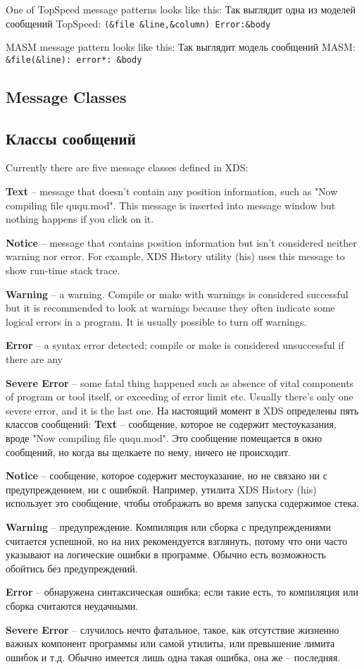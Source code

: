 \ifenglish
One of TopSpeed message patterns looks like this:
\else
Так выглядит одна из моделей сообщений TopSpeed:
\fi
\verb'(&file &line,&column) Error:&body'

\ifenglish
MASM message pattern looks like this:
\else
Так выглядит модель сообщений MASM:
\fi
\verb'&file(&line): error*: &body'

\ifenglish
\subsection{Message Classes}
\else
\subsection{Классы сообщений}
\fi
{}

\ifenglish
Currently there are five message classes defined in XDS:

{\bf Text} -- message that doesn't contain any position information, such as
"Now compiling file ququ.mod". This message is inserted into message window
but nothing happens if you click on it.

{\bf Notice} -- message that contains position information but isn't considered
neither warning nor error. For example, XDS History utility (his) uses this
message to show run-time stack trace.

{\bf Warning} -- a warning. Compile or make with warnings is considered successful
but it is recommended to look at warnings because they often indicate some
logical errors in a program. It is usually possible to turn off warnings.

{\bf Error} -- a syntax error detected; compile or make is considered unsuccessful
if there are any

{\bf Severe Error} -- some fatal thing happened such as absence of vital components
of program or tool itself, or exceeding of error limit etc. Usually there's only
one severe error, and it is the last one.
\else
На настоящий момент в XDS определены пять классов сообщений:
{\bf Text} -- сообщение, которое не содержит местоуказания, вроде
"Now compiling file ququ.mod". Это сообщение помещается в окно сообщений,
но когда вы щелкаете по нему, ничего не происходит. 

{\bf Notice} -- сообщение, которое содержит местоуказание, но не связано ни с  
предупреждением, ни с ошибкой. Например, утилита XDS History (his) использует
это сообщение, чтобы отображать во время запуска содержимое стека.

{\bf Warning} -- предупреждение. Компиляция или сборка с предупреждениями считается
успешной, но на них рекомендуется взглянуть, потому что они часто указывают
на логические ошибки в программе. Обычно есть возможность обойтись без предупреждений.

{\bf Error} -- обнаружена синтаксическая ошибка; если такие есть, то компиляция или 
сборка считаются неудачными.

{\bf Severe Error} -- случилось нечто фатальное, такое, как отсутствие жизненно
важных компонент программы или самой утилиты, или превышение лимита ошибок и т.д.
Обычно имеется лишь одна такая ошибка, она же -- последняя.
\fi